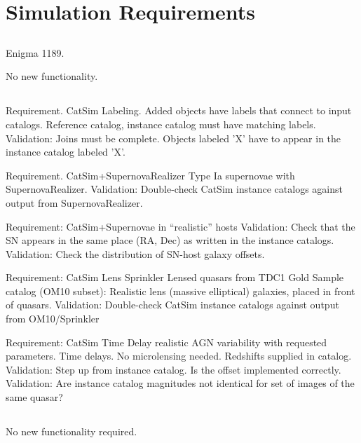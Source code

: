 \section{Simulation Requirements}
\label{sec:twinkles1:simulations}



\subsection{\OpSim}

Enigma 1189.

No new functionality.


\subsection{\CatSim}

Requirement.  CatSim Labeling.
Added objects have labels that connect to input catalogs.  Reference catalog, instance catalog must have matching labels.
Validation:  Joins must be complete.  Objects labeled 'X' have to appear in the instance catalog labeled 'X'.

Requirement.  CatSim+SupernovaRealizer
Type Ia supernovae with SupernovaRealizer. 
Validation:  Double-check CatSim instance catalogs against output from SupernovaRealizer.

Requirement:  CatSim+Supernovae in ``realistic'' hosts 
Validation:  Check that the SN appears in the same place (RA, Dec) as written in the instance catalogs.
Validation:  Check the distribution of SN-host galaxy offsets.

Requirement:  CatSim Lens Sprinkler
Lensed quasars from TDC1 Gold Sample catalog (OM10 subset):
Realistic lens (massive elliptical) galaxies, placed in front of quasars.
Validation:  Double-check CatSim instance catalogs against output from OM10/Sprinkler

Requirement:  CatSim Time Delay
realistic AGN variability with requested parameters. Time delays.
No microlensing needed. Redshifts supplied in catalog.
Validation:  Step up from instance catalog.  Is the offset implemented correctly.
Validation:  Are instance catalog magnitudes not identical for set of images of the same quasar?



\subsection{\PhoSim}

No new functionality required.

